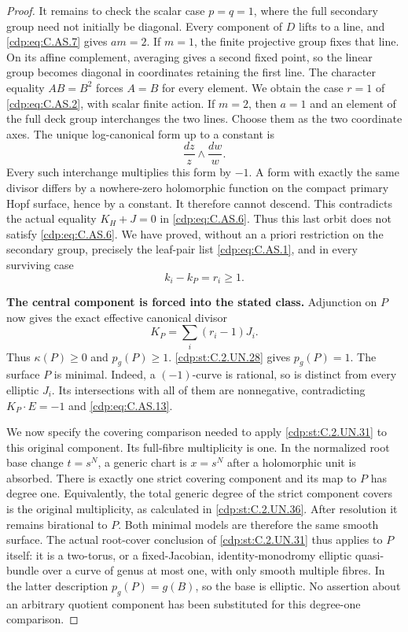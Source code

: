 \begin{proof}
It remains to check the scalar case $p=q=1$,
where the full secondary group need not initially
be diagonal. Every component of $D$ lifts to a
line, and \eqref{cdp:eq:C.AS.7} gives $am=2$. If $m=1$,
the finite projective group fixes that line.
On its affine complement, averaging gives a
second fixed point, so the linear group becomes
diagonal in coordinates retaining the first line.
The character equality $AB=B^2$ forces $A=B$
for every element. We obtain the case $r=1$
of \eqref{cdp:eq:C.AS.2}, with scalar finite action.
If $m=2$, then $a=1$ and an element of the full
deck group interchanges the two lines. Choose
them as the two coordinate axes. The unique
log-canonical form up to a constant is
\[
                             \frac{dz}{z}\wedge\frac{dw}{w}.
                                                               \tag{C.AS.11}\label{cdp:eq:C.AS.11}
\]
Every such interchange multiplies this form
by $-1$. A form with exactly the same divisor
differs by a nowhere-zero holomorphic function
on the compact primary Hopf surface, hence by
a constant. It therefore cannot descend.
This contradicts the actual equality
$K_H+J=0$ in \eqref{cdp:eq:C.AS.6}. Thus this last orbit
does not satisfy \eqref{cdp:eq:C.AS.6}. We have proved,
without an a priori restriction on the secondary
group, precisely the leaf-pair list \eqref{cdp:eq:C.AS.1},
and in every surviving case
\[
                              k_i-k_P=r_i\ge1.          \tag{C.AS.12}\label{cdp:eq:C.AS.12}
\]

\par\medskip\noindent\textbf{The central component is forced into the stated class.}
Adjunction on $P$ now gives the exact effective
canonical divisor
\[
                         K_P=\sum_i(r_i-1)J_i .         \tag{C.AS.13}\label{cdp:eq:C.AS.13}
\]
Thus $\kappa(P)\ge0$ and $p_g(P)\ge1$.
\ref{cdp:st:C.2.UN.28} gives $p_g(P)=1$. The surface $P$
is minimal. Indeed, a $(-1)$-curve is rational,
so is distinct from every elliptic $J_i$.
Its intersections with all of them are
nonnegative, contradicting $K_P\cdot E=-1$
and \eqref{cdp:eq:C.AS.13}.

We now specify the covering comparison needed
to apply \ref{cdp:st:C.2.UN.31} to this original component.
Its full-fibre multiplicity is one. In the
normalized root base change $t=s^N$, a generic
chart is $x=s^N$ after a holomorphic unit is
absorbed. There is exactly one strict covering
component and its map to $P$ has degree one.
Equivalently, the total generic degree of the
strict component covers is the original
multiplicity, as calculated in \ref{cdp:st:C.2.UN.36}.
After resolution it remains birational to $P$.
Both minimal models are therefore the same
smooth surface. The actual root-cover conclusion
of \ref{cdp:st:C.2.UN.31} thus applies to $P$ itself:
it is a two-torus, or a fixed-Jacobian,
identity-monodromy elliptic quasi-bundle over
a curve of genus at most one, with only smooth
multiple fibres. In the latter description
$p_g(P)=g(B)$, so the base is elliptic.
No assertion about an arbitrary quotient
component has been substituted for this
degree-one comparison.


\end{proof}
